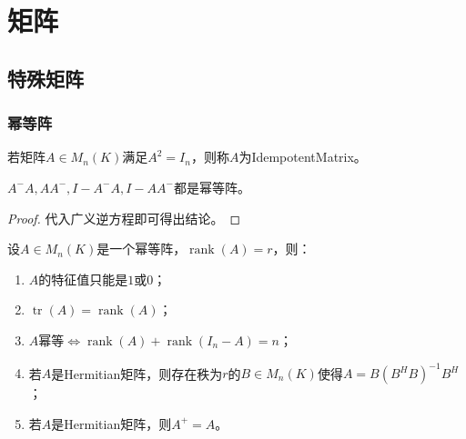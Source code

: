 \chapter{矩阵}









\section{特殊矩阵}
\subsection{幂等阵}
\begin{definition}
	若矩阵$A\in M_{n}(K)$满足$A^2=I_n$，则称$A$为\gls{IdempotentMatrix}。
\end{definition}
\begin{theorem}\label{theo:A^-AIdempotent}
	$A^-A,AA^-,I-A^-A,I-AA^-$都是幂等阵。
\end{theorem}
\begin{proof}
	代入广义逆方程即可得出结论。
\end{proof}
\begin{property}\label{prop:IdempotentMat}
	设$A\in M_{n}(K)$是一个幂等阵，$\operatorname{rank}(A)=r$，则：
	\begin{enumerate}
		\item $A$的特征值只能是$1$或$0$；
		\item $\operatorname{tr}(A)=\operatorname{rank}(A)$；
		\item $A\text{幂等}\Leftrightarrow\operatorname{rank}(A)+\operatorname{rank}(I_n-A)=n$；
		\item 若$A$是Hermitian矩阵，则存在秩为$r$的$B\in M_{n}(K)$使得$A=B(B^HB)^{-1}B^H$；
		\item 若$A$是Hermitian矩阵，则$A^+=A$。
	\end{enumerate}
\end{property}
